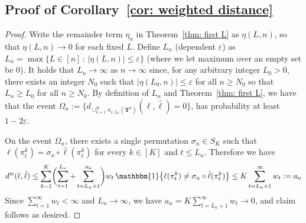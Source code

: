 \documentclass[twoside,11pt]{article}
\theoremstyle{remark}
\begin{document}
\subsection{Proof of Corollary~\ref{cor: weighted distance}}

\begin{proof}

Write the remainder term $\eta_n$ in Theorem~\ref{thm: first L} as $\eta(L,n)$, so that $\eta(L,n)\to0$ for each fixed $L$. Define $L_n$ (dependent $\varepsilon$) as $L_n = \max \{ L \in [n] \,:\, |\eta(L, n)| \leq \varepsilon \}$ (where we let maximum over an empty set be 0). It holds that $L_n \rightarrow \infty$ as $n \rightarrow \infty$ since, for any arbitrary integer $L_0 > 0$, there exists an integer $N_0$ such that $|\eta(L_0, n)| \leq \varepsilon$ for all $n \geq N_0$ so that $L_n \geq L_0$ for all $n \geq N_0$. By definition of $L_n$ and Theorem~\ref{thm: first L}, we have that the event $\Omega_n:=
\bigl\{
d_{\cup_{k=1}^K\pi_{1:L_n}(\bm T^k)}
(\ell,\hat{\ell})=0
\bigr\}$,
has probability at least $1-2\varepsilon$.


On the event $\Omega_n$, there exists a single permutation $\sigma_n\in S_K$ such that $\ell(\pi_t^k)=\sigma_n\circ\hat{\ell}(\pi_t^k)$ for every $k\in[K]$ and $t\leq L_n$. 
Therefore we have
%
\begin{equation*}
d^w(\ell,\hat{\ell})\leq
\sum_{k=1}^K
\biggl(\sum_{t=1}^{L_n}+\sum_{t=L_n+1}^{n_k}\biggr)
w_t\,\mathbbm{1}\bigl\{
\ell(\pi_t^k)\neq\sigma_n\circ\hat{\ell}(\pi_t^k)
\bigr\}\leq K\sum_{t=L_n+1}^{\infty}w_t:=a_n
\end{equation*}
%
Since $\sum_{t=1}^{\infty}w_t<\infty$ and $L_n\to\infty$, we have $a_n=K\sum_{t=L_n+1}^{\infty}w_t\to0$, and claim follows as desired.
\end{proof}
\end{document}
